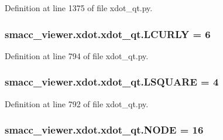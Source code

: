Definition at line 1375 of file xdot\+\_\+qt.\+py.

\subsubsection[{\texorpdfstring{L\+C\+U\+R\+LY}{LCURLY}}]{ smacc\+\_\+viewer.\+xdot.\+xdot\+\_\+qt.\+L\+C\+U\+R\+LY = 6}\hypertarget{namespacesmacc__viewer_1_1xdot_1_1xdot__qt_afb746b1f01b1a0148f336cf5ad0ba272}{}\label{namespacesmacc__viewer_1_1xdot_1_1xdot__qt_afb746b1f01b1a0148f336cf5ad0ba272}


Definition at line 794 of file xdot\+\_\+qt.\+py.

\subsubsection[{\texorpdfstring{L\+S\+Q\+U\+A\+RE}{LSQUARE}}]{ smacc\+\_\+viewer.\+xdot.\+xdot\+\_\+qt.\+L\+S\+Q\+U\+A\+RE = 4}\hypertarget{namespacesmacc__viewer_1_1xdot_1_1xdot__qt_aad1cadfd64f982a2ec153bef460c4a4f}{}\label{namespacesmacc__viewer_1_1xdot_1_1xdot__qt_aad1cadfd64f982a2ec153bef460c4a4f}


Definition at line 792 of file xdot\+\_\+qt.\+py.

\subsubsection[{\texorpdfstring{N\+O\+DE}{NODE}}]{ smacc\+\_\+viewer.\+xdot.\+xdot\+\_\+qt.\+N\+O\+DE = 16}\hypertarget{namespacesmacc__viewer_1_1xdot_1_1xdot__qt_ab3037fa9e7af62e853f743e1bab0285e}{}\label{namespacesmacc__viewer_1_1xdot_1_1xdot__qt_ab3037fa9e7af62e853f743e1bab0285e}


